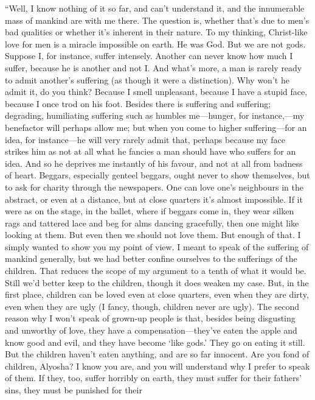 ``Well, I know nothing of it so far, and can't understand it, and the
innumerable mass of mankind are with me there. The question is,
whether that's due to men's bad qualities or whether it's inherent in
their nature. To my thinking, Christ-like love for men is a miracle
impossible on earth. He was God. But we are not gods. Suppose I, for
instance, suffer intensely. Another can never know how much I suffer,
because he is another and not I. And what's more, a man is rarely
ready to admit another's suffering (as though it were a distinction).
Why won't he admit it, do you think? Because I smell unpleasant,
because I have a stupid face, because I once trod on his foot. Besides
there is suffering and suffering; degrading, humiliating suffering
such as humbles me---hun\-ger, for instance,---my benefactor will
perhaps allow me; but when you come to higher suffering---for an idea,
for in\-stance---he will very rarely admit that, perhaps because my
face strikes him as not at all what he fancies a man should have who
suffers for an idea. And so he deprives me instantly of his favour,
and not at all from badness of heart. Beggars, especially genteel
beggars, ought never to show themselves, but to ask for charity
through the newspapers. One can love one's neighbours in the abstract,
or even at a distance, but at close quarters it's almost impossible.
If it were as on the stage, in the ballet, where if beggars come in,
they wear silken rags and tattered lace and beg for alms dancing
gracefully, then one might like looking at them. But even then we
should not love them. But enough of that. I simply wanted to show you
my point of view. I meant to speak of the suffering of mankind
generally, but we had better confine ourselves to the sufferings
 of the children. That reduces the scope of my argument to a
tenth of what it would be. Still we'd better keep to the children,
though it does weaken my case. But, in the first place, children can
be loved even at close quarters, even when they are dirty, even when
they are ugly (I fancy, though, children never are ugly). The second
reason why I won't speak of grown-up people is that, besides being
disgusting and unworthy of love, they have a
com\-pen\-sa\-tion---they've eaten the apple and know good and evil,
and they have become `like gods.' They go on eating it still. But the
children haven't eaten anything, and are so far innocent. Are you fond
of children, Alyosha? I know you are, and you will understand why I
prefer to speak of them. If they, too, suffer horribly on earth, they
must suffer for their fathers' sins, they must be punished for their
